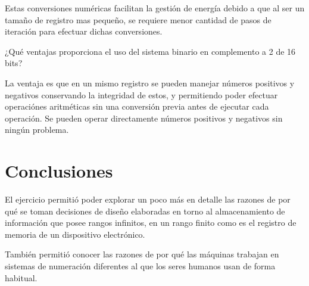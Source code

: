 \documentclass[stu, 12pt, letterpaper, donotrepeattitle, floatsintext, natbib]{apa7}
\begin{document}
Estas conversiones numéricas facilitan la gestión de energía debido a que al ser un tamaño de registro mas pequeño, se requiere menor cantidad de pasos de iteración para efectuar dichas conversiones.

¿Qué ventajas proporciona el uso del sistema binario en complemento a 2 de 16 bits?

La ventaja es que en un mismo registro se pueden manejar números positivos y negativos conservando la integridad de estos, y permitiendo poder efectuar operaciónes aritméticas sin una conversión previa antes de ejecutar cada operación. Se pueden operar directamente números positivos y negativos sin ningún problema.

\section{\large Conclusiones}
El ejercicio permitió poder explorar un poco más en detalle las razones de por qué se toman decisiones de diseño elaboradas en torno al almacenamiento de información que posee rangos infinitos, en un rango finito como es el registro de memoria de un dispositivo electrónico.

También permitió conocer las razones de por qué las máquinas trabajan en sistemas de numeración diferentes al que los seres humanos usan de forma habitual.


\newpage
\renewcommand\refname{\large\textbf{Referencias}}

\end{document}
